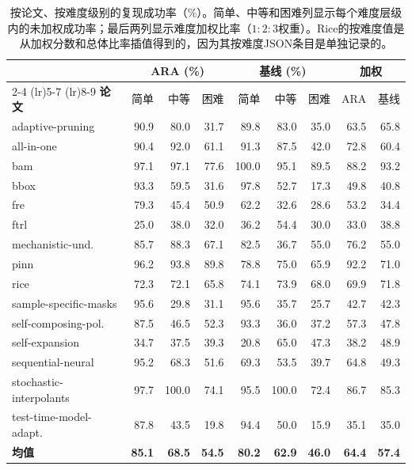 \begin{table}[h]
\centering
\small
\begin{tabular}{l rrr rrr rr}
\toprule
& \multicolumn{3}{c}{\textbf{ARA (\%)}} & \multicolumn{3}{c}{\textbf{基线 (\%)}} & \multicolumn{2}{c}{\textbf{加权}} \\
\cmidrule(lr){2-4} \cmidrule(lr){5-7} \cmidrule(lr){8-9}
\textbf{论文} & 简单 & 中等 & 困难 & 简单 & 中等 & 困难 & ARA & 基线 \\
\midrule
adaptive-pruning        & 90.9 & 80.0 & 31.7 & 89.8 & 83.0 & 35.0 & 63.5 & 65.8 \\
all-in-one              & 90.4 & 92.0 & 61.1 & 91.3 & 87.5 & 42.0 & 72.8 & 60.4 \\
bam                     & 97.1 & 97.1 & 77.6 & 100.0 & 95.1 & 89.5 & 88.2 & 93.2 \\
bbox                    & 93.3 & 59.5 & 31.6 & 97.8 & 52.7 & 17.3 & 49.8 & 40.8 \\
fre                     & 79.3 & 45.4 & 50.9 & 62.2 & 32.6 & 28.6 & 53.2 & 34.4 \\
ftrl                    & 25.0 & 38.0 & 32.0 & 36.2 & 54.4 & 30.0 & 33.0 & 38.8 \\
mechanistic-und.        & 85.7 & 88.3 & 67.1 & 82.5 & 36.7 & 55.0 & 76.2 & 55.0 \\
pinn                    & 96.2 & 93.8 & 89.8 & 78.8 & 75.0 & 65.9 & 92.2 & 71.0 \\
rice                    & 72.3 & 72.1 & 65.8 & 74.1 & 73.9 & 68.0 & 69.9 & 71.8 \\
sample-specific-masks   & 95.6 & 29.8 & 31.1 & 95.6 & 35.7 & 25.7 & 42.7 & 42.3 \\
self-composing-pol.     & 87.5 & 46.5 & 52.3 & 93.3 & 36.0 & 37.2 & 57.3 & 47.8 \\
self-expansion          & 34.7 & 37.5 & 39.3 & 20.8 & 65.0 & 47.3 & 38.2 & 48.9 \\
sequential-neural       & 95.2 & 68.3 & 51.6 & 69.3 & 53.5 & 39.7 & 64.8 & 49.3 \\
stochastic-interpolants & 97.7 & 100.0 & 74.1 & 95.5 & 100.0 & 72.4 & 86.7 & 85.3 \\
test-time-model-adapt.  & 87.8 & 43.5 & 19.8 & 94.4 & 50.0 & 15.9 & 35.1 & 35.0 \\
\midrule
\textbf{均值}           & \textbf{85.1} & \textbf{68.5} & \textbf{54.5} & \textbf{80.2} & \textbf{62.9} & \textbf{46.0} & \textbf{64.4} & \textbf{57.4} \\
\bottomrule
\end{tabular}
\caption{按论文、按难度级别的复现成功率（\%）。简单、中等和困难列显示每个难度层级内的未加权成功率；最后两列显示难度加权比率（$1\!:\!2\!:\!3$权重）。Rice的按难度值是从加权分数和总体比率插值得到的，因为其按难度JSON条目是单独记录的。}
\label{tbl-repro-per-difficulty}
\end{table}

